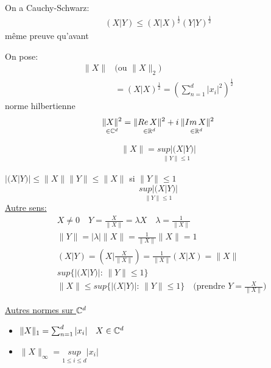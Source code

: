 \begin{explanation}
    On a Cauchy-Schwarz:
    \begin{align*}
        (X|Y) \le (X|X)^{\frac{1}{2}}(Y|Y)^{\frac{1}{2}}
    \end{align*}
    même preuve qu'avant
\end{explanation}
On pose:
\begin{align*}
    \|X\| & \text{(ou }\|X\|_2\text{)}\\
          &= (X|X)^{\frac{1}{2}} = \left( \sum_{n=1}^{d} |x_i|^2 \right)^{\frac{1}{2}}
\end{align*}
norme hilbertienne
\[
    \underset{\in \mathbb{C}^d}{\|X\|^2} = \underset{\in \mathbb{R}^d}{\|Re\,X\|^2} + i\underset{\in \mathbb{R}^d}{\:\|Im\,X\|^2}\\
\] 
\begin{lemma}
   \begin{align*}
       \|X\| = \underset{\|Y\|\le 1}{sup|(X|Y)|}
   \end{align*} 
\end{lemma}
\begin{explanation}
    $|(X|Y)| \le \|X\|\|Y\| \le \|X\|$ si $\|Y\| \le 1$
    \[
    \underset{\|Y\|\le 1}{sup|(X|Y)|}
    \] 
    \underline{Autre sens:} 
    \begin{align*}
        &X \neq 0 \quad Y =  \frac{X}{\|X\|} = \lambda X \quad \lambda = \frac{1}{\|X\|}\\
        &\|Y\| = |\lambda|\|X\| = \frac{1}{\|X\|}\|X\| = 1\\
        &(X|Y) = (X|\frac{X}{\|X\|}) = \frac{1}{\|X\|}(X|X) = \|X\|\\
        &sup \{|(X|Y)|: \, \|Y\| \le  1\}\\
        &\|X\| \le sup \{|(X|Y)|: \, \|Y\|\le 1\} \quad \text{(prendre }Y = \frac{X}{\|X\|}\text{)}
    \end{align*}

\end{explanation}
\underline{Autres normes sur $\mathbb{C}^d$}
\begin{itemize}
    \item $\|X\|_1 = \sum_{n=1}^{d} |x_i| \quad X \in \mathbb{C}^d$
    \item $\|X\|_{\infty} = \underset{1\le i \le d}{sup} |x_i|$
\end{itemize}
